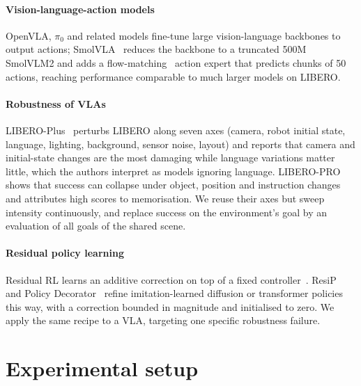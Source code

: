 \documentclass[10pt,twocolumn,letterpaper]{article}
\begin{document}
\paragraph{Vision-language-action models} OpenVLA, $\pi_0$ and related models fine-tune large
vision-language backbones to output actions; SmolVLA~\citep{shukor2025smolvla} reduces the backbone to a
truncated 500M SmolVLM2 and adds a flow-matching~\citep{lipmanflow2022} action expert that predicts chunks
of 50 actions, reaching performance comparable to much larger models on LIBERO.

\paragraph{Robustness of VLAs} LIBERO-Plus~\citep{fei2025liberoplus} perturbs LIBERO along seven axes
(camera, robot initial state, language, lighting, background, sensor noise, layout) and reports that
camera and initial-state changes are the most damaging while language variations matter little, which the
authors interpret as models ignoring language. LIBERO-PRO~\citep{zhou2025liberopro} shows that success can
collapse under object, position and instruction changes and attributes high scores to memorisation. We
reuse their axes but sweep intensity continuously, and replace success on the environment's goal by an
evaluation of all goals of the shared scene.

\paragraph{Residual policy learning} Residual RL learns an additive correction on top of a fixed
controller~\citep{silver2018residual,johannink2019residual}. ResiP~\citep{ankile2024resip} and Policy
Decorator~\citep{yuan2024policydecorator} refine imitation-learned diffusion or transformer policies this
way, with a correction bounded in magnitude and initialised to zero. We apply the same recipe to a VLA,
targeting one specific robustness failure.

\section{Experimental setup}
\end{document}

